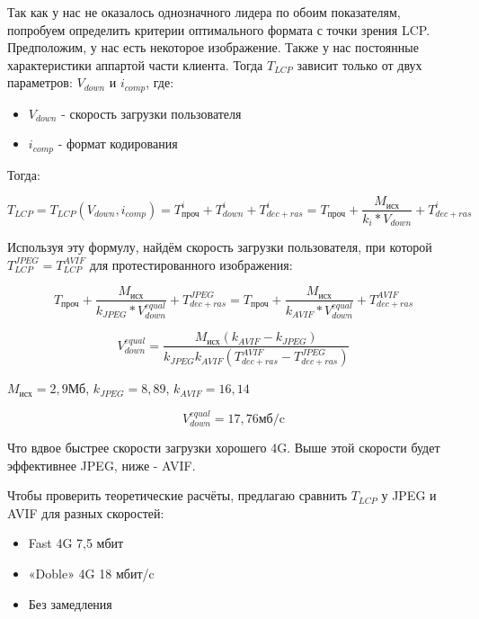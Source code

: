 \documentclass[12pt]{article}
\begin{document}
Так как у нас не оказалось однозначного лидера по обоим показателям, попробуем определить критерии оптимального формата с точки зрения LCP. Предположим, у нас есть некоторое изображение.
Также у нас постоянные характеристики аппартой части клиента. Тогда $T_{LCP}$ зависит только от двух параметров: $V_{down}$ и $i_{comp}$, где:

\begin{itemize}
    \item $V_{down}$ - скорость загрузки пользователя
    \item $i_{comp}$ - формат кодирования
\end{itemize}

Тогда:

\[
    T_{LCP} = T_{LCP}(V_{down}, i_{comp}) = T^{i}_{\text{проч}} + T^{i}_{down} + T^{i}_{dec+ras} = T_{\text{проч}} + \frac{M_{\text{исх}}}{k_{i}*V_{down}} + T^{i}_{dec+ras}
\]

Используя эту формулу, найдём скорость загрузки пользователя, при которой $T^{JPEG}_{LCP} = T^{AVIF}_{LCP}$ для протестированного изображения:

\[
    T_{\text{проч}} + \frac{M_{\text{исх}}}{k_{JPEG}*V^{equal}_{down}} + T^{JPEG}_{dec+ras} = T_{\text{проч}} + \frac{M_{\text{исх}}}{k_{AVIF}*V^{equal}_{down}} + T^{AVIF}_{dec+ras}
\]

\begin{equation}
    V^{equal}_{down} = \frac{M_{\text{исх}}(k_{AVIF}-k_{JPEG})}{k_{JPEG}k_{AVIF}(T^{AVIF}_{dec+ras} - T^{JPEG}_{dec+ras})}
\end{equation}

$M_{\text{исх}} = 2,9\text{Мб}$, $k_{JPEG} = 8,89$, $k_{AVIF} = 16,14$

\[
    V^{equal}_{down} = 17,76 \text{мб/c}
\]

Что вдвое быстрее скорости загрузки хорошего 4G.
Выше этой скорости будет эффективнее JPEG, ниже - AVIF.

Чтобы проверить теоретические расчёты, предлагаю сравнить $T_{LCP}$ у JPEG
и AVIF для разных скоростей:

\begin{itemize}
    \item Fast 4G 7,5 мбит
    \item «Doble» 4G 18 мбит/c
    \item Без замедления
\end{itemize}
\end{document}

